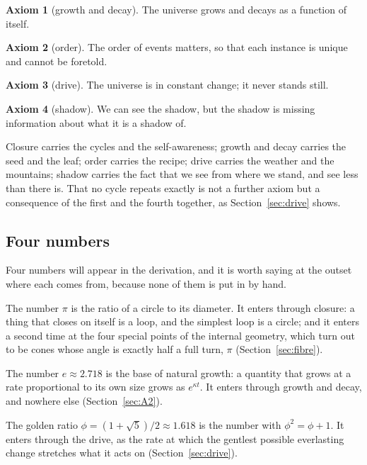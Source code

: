 \documentclass[11pt,a4paper]{article}
\theoremstyle{plain}
\theoremstyle{definition}
\newtheorem{axiom}{Axiom}
\theoremstyle{remark}
\begin{document}
\begin{axiom}[growth and decay]\label{ax:A2}
The universe grows and decays as a function of itself.
\end{axiom}

\begin{axiom}[order]\label{ax:A3}
The order of events matters, so that each instance is unique and cannot be foretold.
\end{axiom}

\begin{axiom}[drive]\label{ax:A4}
The universe is in constant change; it never stands still.
\end{axiom}

\begin{axiom}[shadow]\label{ax:A5}
We can see the shadow, but the shadow is missing information about what it is a shadow of.
\end{axiom}

Closure carries the cycles and the self-awareness; growth and decay carries the seed and the leaf; order carries the recipe; drive carries the weather and the mountains; shadow carries the fact that we see from where we stand, and see less than there is. That no cycle repeats exactly is not a further axiom but a consequence of the first and the fourth together, as Section~\ref{sec:drive} shows.

\subsection{Four numbers}\label{sec:numbers}

Four numbers will appear in the derivation, and it is worth saying at the outset where each comes from, because none of them is put in by hand.

The number $\pi$ is the ratio of a circle to its diameter. It enters through closure: a thing that closes on itself is a loop, and the simplest loop is a circle; and it enters a second time at the four special points of the internal geometry, which turn out to be cones whose angle is exactly half a full turn, $\pi$ (Section~\ref{sec:fibre}).

The number $e\approx2.718$ is the base of natural growth: a quantity that grows at a rate proportional to its own size grows as $e^{\kappa t}$. It enters through growth and decay, and nowhere else (Section~\ref{sec:A2}).

The golden ratio $\phi=(1+\sqrt5)/2\approx1.618$ is the number with $\phi^{2}=\phi+1$. It enters through the drive, as the rate at which the gentlest possible everlasting change stretches what it acts on (Section~\ref{sec:drive}).
\end{document}
